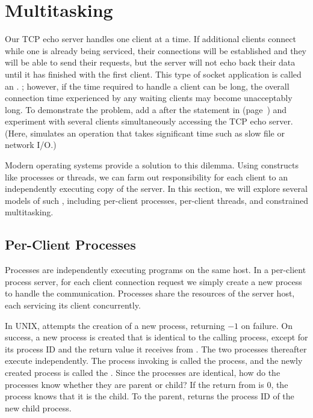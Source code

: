 \section{Multitasking}

\noindent Our TCP echo server handles one client at a time.
If additional clients connect while one is already being
serviced, their connections will be established and they will be able
to send their requests, but the server will not echo back their data
until it has finished with the first client.
This type of socket
application is called an .
; however,
if the time required to handle a client can be long,
the overall connection time
experienced by any waiting clients may become unacceptably long.
To demonstrate the problem, add a  after
the  statement in 
(page~\pageref{code/TCPEchoClient.c}) and
experiment with several clients simultaneously accessing the
TCP echo server. (Here,  simulates an operation that
takes significant time such as slow file or network I/O.)

Modern operating systems provide a solution to
this dilemma.  Using constructs like processes or threads, we can
farm out responsibility for each client to an
independently executing copy of the server.
In this section, we will
explore several models of such , including
per-client processes, per-client threads, and constrained
multitasking.

\subsection{Per-Client Processes}

\noindent Processes are independently executing programs on the same host.
In a per-client process server, for each client connection request we simply
create a new process to handle the communication.
Processes share the resources of the server host, each servicing its
client concurrently.

In UNIX,  attempts the creation of a new process,
returning $-1$ on failure.  On success,
a new process is created that is identical to the calling process, except
for its process ID and the return value it receives from
.
The two processes thereafter execute independently.  The process
invoking  is called the
 process, and the
newly created process is called the .  Since the
processes are identical, how do the processes
know whether they are parent or child?  If the return from
 is
$0$, the process knows that it is the child.  To the parent,
 returns the process ID of the new child process.

